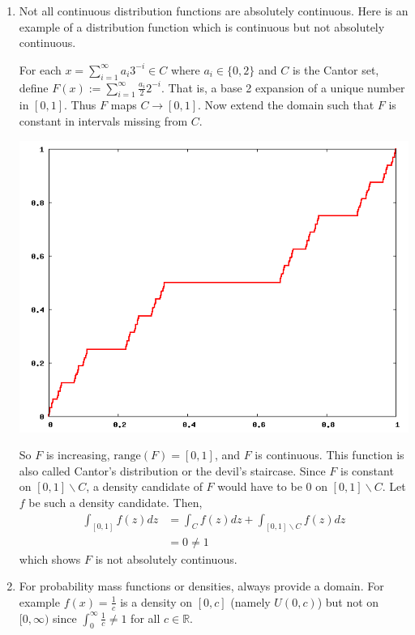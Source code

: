 \documentclass{article}
\newcommand{\R}{\mathbb{R}}
\begin{document}
\begin{myrem}{}{}
\begin{enumerate}
			\item Not all continuous distribution functions are absolutely continuous. Here is an example of a distribution function which is continuous but not absolutely continuous.
			
			For each $x=\sum_{i=1}^{\infty}a_i3^{-i}\in C$ where $a_i\in\{0, 2\}$ and $C$ is the Cantor set, define $F(x):=\sum_{i=1}^{\infty}\frac{a_i}{2}2^{-i}$. That is, a base 2 expansion of a unique number in $[0, 1]$. Thus $F$ maps $C\to[0, 1]$. Now extend the domain such that $F$ is constant in intervals missing from $C$.
			
			\includegraphics[scale=.5]{devil.png}
			
			So $F$ is increasing, $\mbox{range}(F)=[0, 1]$, and $F$ is continuous. This function is also called Cantor's distribution or the devil's staircase. Since $F$ is constant on $[0, 1]\backslash C$, a density candidate of $F$ would have to be 0 on $[0, 1]\backslash C$. Let $f$ be such a density  candidate. Then,
			\begin{align*}
				\int_{[0, 1]}f(z)dz&=\int_Cf(z)dz+\int_{[0, 1]\backslash C}f(z)dz\\
				&=0\neq1
			\end{align*}
			which shows $F$ is not absolutely continuous.
			
			\item For probability mass functions or densities, always provide a domain. For example $f(x)=\frac{1}{c}$ is a density on $[0, c]$ (namely $U(0, c)$) but not on $[0, \infty)$ since $\int_{0}^{\infty}\frac{1}{c}\neq1$ for all $c\in\R$.
		\end{enumerate}
	\end{myrem}
	
\end{document}

